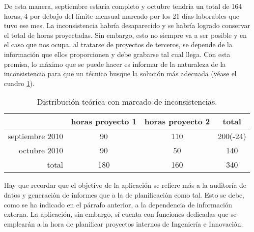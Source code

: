 \begin{description}
De esta manera, septiembre estaría completo y octubre tendría un total de 164
horas, 4 por debajo del límite mensual marcado por los 21 días laborables que
tuvo ese mes. La inconsistencia habría desaparecido y se habría logrado
conservar el total de horas proyectadas. Sin embargo, esto no siempre va a ser
posible y en el caso que nos ocupa, al tratarse de proyectos de terceros, se
depende de la información que ellos proporcionen y debe grabarse tal cual
llega. Con esta premisa, lo máximo que se puede hacer es informar de la
naturaleza de la inconsistencia para que un técnico busque la solución más
adecuada (véase el cuadro \ref{tab:distribucion_marcada}).

\begin{table}
\centering
\begin{tabular}{|r|c|c||c|}\hline
 & horas proyecto 1  & horas proyecto 2 & total\\\hline\hline
septiembre 2010 & 90 & 110 & {\color{red} 200(-24)} \\\hline
octubre 2010 & 90 & 50 & 140\\\hline\hline
total & 180 & 160 & 340\\\hline
\end{tabular}
\caption{Distribución teórica con marcado de inconsistencias.}
\label{tab:distribucion_marcada}
\end{table}

\end{description}

Hay que recordar que el objetivo de la aplicación se refiere más a la auditoría
de datos y generación de informes que a la de planificación como tal. Esto se
debe, como se ha indicado en el párrafo anterior, a la dependencia de
información externa. La aplicación, sin embargo, sí cuenta con funciones
dedicadas que se emplearán a la hora de planificar proyectos internos de
Ingeniería e Innovación.


